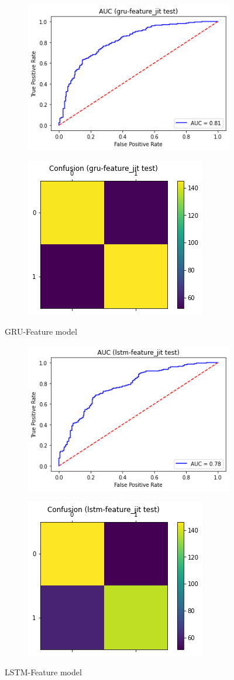 \documentclass[format=sigconf, nonacm=true, review=false, screen=true]{acmart}
\begin{document}
\newpage
\begin{figure}[H]
     \centering
     \begin{subfigure}
         \centering
         \includegraphics[width=0.24\columnwidth]{figures/gru-feature-roc.png}
     \end{subfigure}
     \begin{subfigure}
         \centering
         \includegraphics[width=0.24\columnwidth]{figures/gru-feature-cm.png}
     \end{subfigure}
     \caption{GRU-Feature model}
     \label{fig:gru-feature-roc-cm}
     
     \centering
     \begin{subfigure}
         \centering
         \includegraphics[width=0.24\columnwidth]{figures/lstm-feature-roc.png}
     \end{subfigure}
     \begin{subfigure}
         \centering
         \includegraphics[width=0.24\columnwidth]{figures/lstm-feature-cm.png}
     \end{subfigure}
     \caption{LSTM-Feature model}
     \label{fig:lstm-feature-roc-cm}
\end{figure}

\newpage
\end{document}
